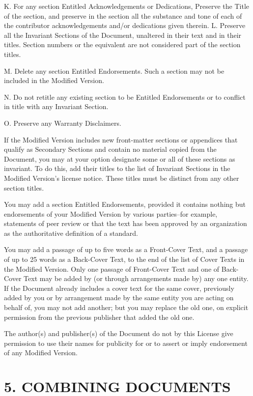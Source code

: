 \documentclass[captions=tableheading]{scrbook}
\begin{document}
K. For any section Entitled Acknowledgements or Dedications, Preserve the Title of the section, and preserve in the section all the substance and tone of each of the contributor acknowledgements and/or dedications given therein. 
L. Preserve all the Invariant Sections of the Document, unaltered in their text and in their titles. Section numbers or the equivalent are not considered part of the section titles. 

M. Delete any section Entitled Endorsements. Such a section may not be included in the Modified Version. 

N. Do not retitle any existing section to be Entitled Endorsements or to conflict in title with any Invariant Section. 

O. Preserve any Warranty Disclaimers.

If the Modified Version includes new front-matter sections or appendices that qualify as Secondary Sections and contain no material copied from the Document, you may at your option designate some or all of these sections as invariant. To do this, add their titles to the list of Invariant Sections in the Modified Version's license notice. These titles must be distinct from any other section titles.

You may add a section Entitled Endorsements, provided it contains nothing but endorsements of your Modified Version by various parties--for example, statements of peer review or that the text has been approved by an organization as the authoritative definition of a standard.

You may add a passage of up to five words as a Front-Cover Text, and a passage of up to 25 words as a Back-Cover Text, to the end of the list of Cover Texts in the Modified Version. Only one passage of Front-Cover Text and one of Back-Cover Text may be added by (or through arrangements made by) any one entity. If the Document already includes a cover text for the same cover, previously added by you or by arrangement made by the same entity you are acting on behalf of, you may not add another; but you may replace the old one, on explicit permission from the previous publisher that added the old one.

The author(s) and publisher(s) of the Document do not by this License give permission to use their names for publicity for or to assert or imply endorsement of any Modified Version.
\section{5. COMBINING DOCUMENTS}
\label{sec-18-6}
\end{document}
